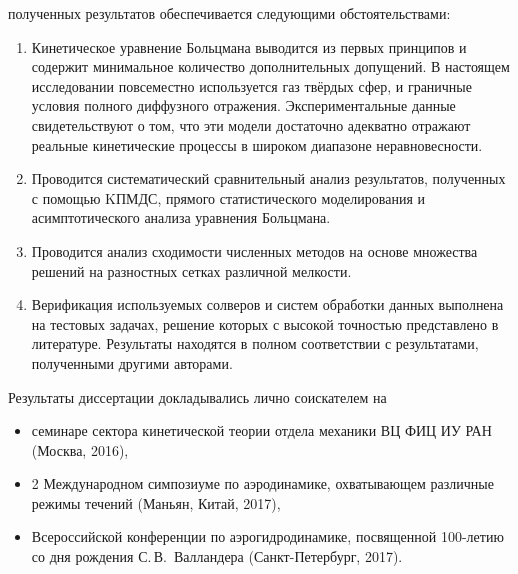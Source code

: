 {\reliability} полученных результатов обеспечивается следующими обстоятельствами:
\begin{enumerate}
    \item Кинетическое уравнение Больцмана выводится из первых принципов и
    содержит минимальное количество дополнительных допущений.
    В настоящем исследовании повсеместно используется газ твёрдых сфер,
    и граничные условия полного диффузного отражения.
    Экспериментальные данные свидетельствуют о том, что эти модели достаточно адекватно отражают
    реальные кинетические процессы в широком диапазоне неравновесности.
    \item Проводится систематический сравнительный анализ результатов,
    полученных с помощью KПМДС, прямого статистического моделирования
    и асимптотического анализа уравнения Больцмана.
    \item Проводится анализ сходимости численных методов на основе
    множества решений на разностных сетках различной мелкости.
    \item Верификация используемых солверов и систем обработки данных
    выполнена на тестовых задачах, решение которых с высокой точностью представлено в литературе.
    Результаты находятся в полном соответствии с результатами, полученными другими авторами.
\end{enumerate}

{\probation} Результаты диссертации докладывались лично соискателем на
\begin{itemize}
    \item семинаре сектора кинетической теории отдела механики ВЦ ФИЦ ИУ РАН (Москва, 2016),
    \item 2 Международном симпозиуме по аэродинамике, охватывающем различные режимы течений (Маньян, Китай, 2017),
    \item Всероссийской конференции по аэрогидродинамике, посвященной 100-летию со дня рождения С.\,В.~Валландера (Санкт-Петербург, 2017).
\end{itemize}

